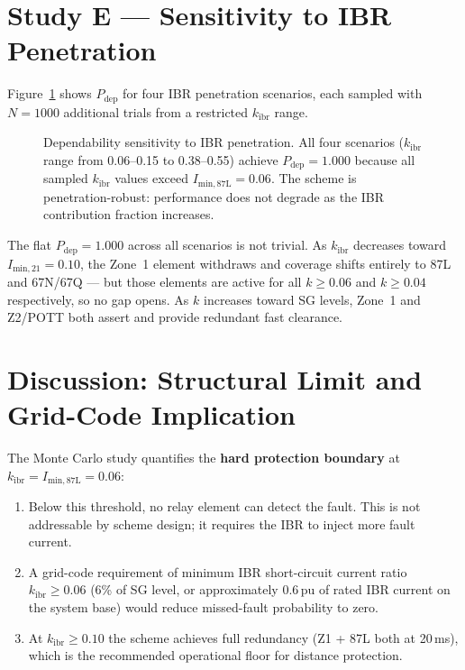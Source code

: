 \documentclass[11pt,a4paper]{article}
\begin{document}
\section{Study E --- Sensitivity to IBR Penetration}
\label{sec:studyE}

Figure~\ref{fig:sensitivity} shows $P_\mathrm{dep}$ for four IBR penetration
scenarios, each sampled with $N=1000$ additional trials from a restricted
$k_\mathrm{ibr}$ range.

\begin{figure}[htbp]
  \centering
  \resizebox{0.72\textwidth}{!}{}
  \caption{Dependability sensitivity to IBR penetration.  All four scenarios
           ($k_\mathrm{ibr}$ range from 0.06--0.15 to 0.38--0.55) achieve
           $P_\mathrm{dep}=1.000$ because all sampled $k_\mathrm{ibr}$ values
           exceed $I_\mathrm{min,87L}=0.06$.  The scheme is penetration-robust:
           performance does not degrade as the IBR contribution fraction
           increases.}
  \label{fig:sensitivity}
\end{figure}

\noindent
The flat $P_\mathrm{dep}=1.000$ across all scenarios is not trivial.  As
$k_\mathrm{ibr}$ decreases toward $I_\mathrm{min,21}=0.10$, the Zone~1
element withdraws and coverage shifts entirely to 87L and 67N/67Q --- but
those elements are active for all $k\geq0.06$ and $k\geq0.04$ respectively,
so no gap opens.  As $k$ increases toward SG levels, Zone~1 and Z2/POTT
both assert and provide redundant fast clearance.

\section{Discussion: Structural Limit and Grid-Code Implication}
\label{sec:discussion}

The Monte Carlo study quantifies the \textbf{hard protection boundary} at
$k_\mathrm{ibr}=I_\mathrm{min,87L}=0.06$:
\begin{enumerate}
  \item Below this threshold, no relay element can detect the fault.  This
    is not addressable by scheme design; it requires the IBR to inject more
    fault current.

  \item A grid-code requirement of minimum IBR short-circuit current ratio
    $k_\mathrm{ibr}\geq0.06$ (6\% of SG level, or approximately 0.6\,pu of
    rated IBR current on the system base) would reduce missed-fault probability
    to zero.

  \item At $k_\mathrm{ibr}\geq0.10$ the scheme achieves full redundancy
    (Z1 + 87L both at 20\,ms), which is the recommended operational floor
    for distance protection.
\end{enumerate}
\end{document}
